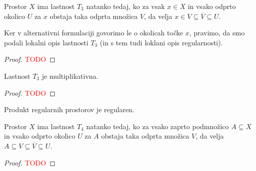 \begin{trditev}
    Prostor $X$ ima lastnost $T_3$ natanko tedaj, ko za vsak $x \in X$ in vsako odprto okolico $U$ za $x$ obstaja taka odprta množica $V$, da velja $x \in V \subseteq \overline{V} \subseteq U$.
\end{trditev}

\begin{opomba}
    Ker v alternativni formulaciji govorimo le o okolicah točke $x$, pravimo, da smo podali lokalni opis lastnosti $T_3$ (in s tem tudi loklani opis regularnosti).
\end{opomba}

\begin{proof}
    \textcolor{red}{TODO}
\end{proof}

\begin{trditev}
    Lastnost $T_3$ je multiplikativna.
\end{trditev}

\begin{proof}
    \textcolor{red}{TODO}
\end{proof}

\begin{posledica}
    Produkt regularnih prostorov je regularen.
\end{posledica}

\newpage
\begin{trditev}
    Prostor $X$ ima lastnost $T_4$ natanko tedaj, ko za vsako zaprto podmnožico $A \subseteq X$ in vsako odprto okolico $U$ za $A$ obstaja taka odprta množica $V$, da velja $A \subseteq V \subseteq \overline{V} \subseteq U$.
\end{trditev}


\begin{proof}
    \textcolor{red}{TODO}
\end{proof}

